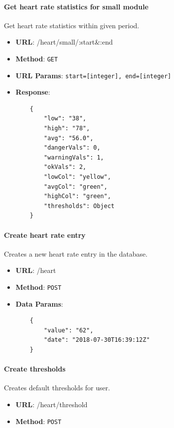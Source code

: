         \paragraph{Get heart rate statistics for small module} Get heart rate statistics within given period.
        \begin{itemize}
            \item \textbf{URL}: /heart/small/:start\&:end
            \item \textbf{Method}: \texttt{GET}
            \item \textbf{URL Params}: \texttt{start=[integer], end=[integer]}
            \item \textbf{Response}: \begin{verbatim}
    {
        "low": "38",
        "high": "78",
        "avg": "56.0",
        "dangerVals": 0,
        "warningVals": 1,
        "okVals": 2,
        "lowCol": "yellow",
        "avgCol": "green",
        "highCol": "green",
        "thresholds": Object
    }
            \end{verbatim}
        \end{itemize}

        \paragraph{Create heart rate entry} Creates a new heart rate entry in the database.
        \begin{itemize}
            \item \textbf{URL}: /heart
            \item \textbf{Method}: \texttt{POST}
            \item \textbf{Data Params}: \begin{verbatim}
    {
        "value": "62",
        "date": "2018-07-30T16:39:12Z"
    }   
            \end{verbatim}
        \end{itemize}

        \paragraph{Create thresholds} Creates default thresholds for user.
        \begin{itemize}
            \item \textbf{URL}: /heart/threshold
            \item \textbf{Method}: \texttt{POST}
        \end{itemize}

